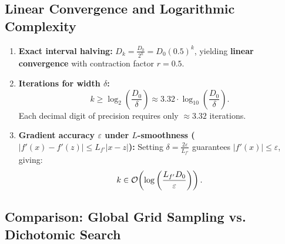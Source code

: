 \begin{algorithm}[H]
\caption{Dichotomic Search for Univariate Optimization (\texttt{DichotomicSearch})}
\label{alg:dichotomic-search-en}

\;
\end{algorithm}

\subsection{Linear Convergence and Logarithmic Complexity}
\begin{enumerate}
    \item \textbf{Exact interval halving:}
    $D_k = \frac{D_0}{2^k} = D_0 (0.5)^k$, yielding \textbf{linear convergence} with contraction factor $r = 0.5$.
    \item \textbf{Iterations for width $\delta$:}
    \begin{equation}
        k \ge \log_2\left(\frac{D_0}{\delta}\right) \approx 3.32 \cdot \log_{10}\left(\frac{D_0}{\delta}\right).
    \end{equation}
    Each decimal digit of precision requires only $\approx 3.32$ iterations.
    \item \textbf{Gradient accuracy $\varepsilon$ under $L$-smoothness ($|f'(x) - f'(z)| \le L_{f'} |x - z|$):}
    Setting $\delta = \frac{2\varepsilon}{L_{f'}}$ guarantees $|f'(x)| \le \varepsilon$, giving:
    \begin{equation}
        k \in \mathcal{O}\!\left(\log\left(\frac{L_{f'} D_0}{\varepsilon}\right)\right).
    \end{equation}
\end{enumerate}

\subsection[Comparison: Global Grid Sampling vs. Dichotomic Search]{Comparison: Global Grid Sampling vs.\\Dichotomic Search}

